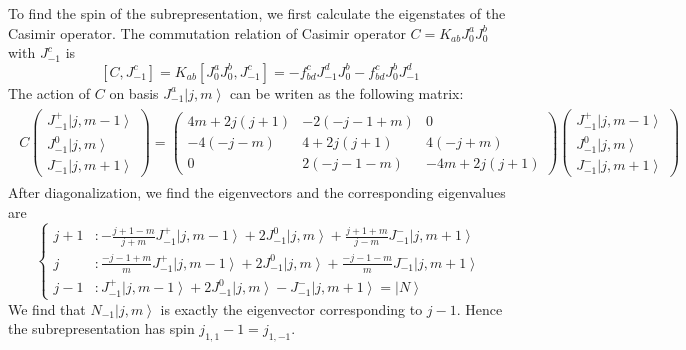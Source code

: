 \documentclass[10pt,a4paper]{article}
\numberwithin{equation}{section}
\newcommand{\ket}[1]{\left| #1 \right\rangle}
\begin{document}
To find the spin of the subrepresentation, we first calculate the eigenstates of the Casimir operator.
The commutation relation of Casimir operator $C = K_{ab} J^{a}_{0} J^{b}_{0}$ with $J^{c}_{-1}$ is 
\begin{equation}
        \left[C,J^{c}_{-1}\right] = K_{ab}\left[J^{a}_{0}J^{b}_{0},J^{c}_{-1}\right]
        = -f^{c}_{bd} J^{d}_{-1}J^{b}_{0} - f^{c}_{bd}J^{b}_{0}J^{d}_{-1}
\end{equation}
The action of $C$ on basis $J^{a}_{-1} \ket{j,m}$ can be writen as the following matrix:
\begin{eqnarray}
    \begin{aligned}
        C 
    \begin{pmatrix}
    J^{+}_{-1} \ket{j,m-1}\\
    J^{0}_{-1} \ket{j,m}\\
    J^{-}_{-1} \ket{j,m+1}
    \end{pmatrix}
    = \begin{pmatrix}
        4m+2j(j+1) & -2 (-j-1+m) & 0\\
        -4 (-j-m) & 4 + 2j(j+1) & 4(-j+m)\\
        0 & 2 (-j-1-m)& -4m + 2j(j+1)
    \end{pmatrix}
    \begin{pmatrix}
        J^{+}_{-1} \ket{j,m-1}\\
        J^{0}_{-1} \ket{j,m}\\
        J^{-}_{-1} \ket{j,m+1}
    \end{pmatrix}
    \end{aligned}
\end{eqnarray}
After diagonalization, we find the eigenvectors and the corresponding eigenvalues are 
\begin{equation}
    \left\{
        \begin{aligned}
            j+1 &: -\frac{j+1-m}{j+m} J^{+}_{-1} \ket{j,m-1} + 2 J^{0}_{-1} \ket{j,m} + \frac{j+1+m}{j-m} J^{-}_{-1} \ket{j,m+1}\\
            j &: \frac{-j-1+m}{m} J^{+}_{-1} \ket{j,m-1} + 2 J^{0}_{-1} \ket{j,m} + \frac{-j-1-m}{m} J^{-}_{-1} \ket{j,m+1}\\
            j-1 &: J^{+}_{-1} \ket{j,m-1} + 2 J^{0}_{-1} \ket{j,m} - J^{-}_{-1} \ket{j,m+1} = \ket{N}
        \end{aligned}
    \right.
\end{equation}
We find that $N_{-1}\ket{j,m}$ is exactly the eigenvector corresponding to $j-1$. Hence the subrepresentation has spin $j_{1,1}-1 = j_{1,-1}$.
\end{document}
